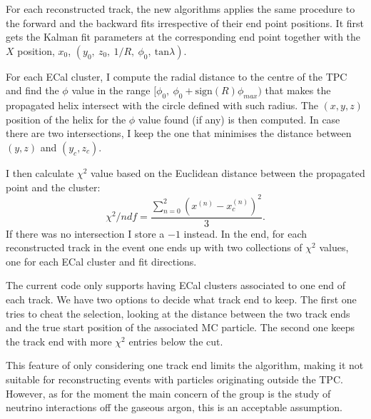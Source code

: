 For each reconstructed track, the new algorithms applies the same procedure to the forward and the backward fits irrespective of their end point positions. It first gets the Kalman fit parameters at the corresponding end point together with the $X$ position, $x_{0}$, $(y_{0}, \ z_{0}, \ 1/R, \ \phi_{0}, \ \mathrm{tan}\lambda)$.

For each ECal cluster, I compute the radial distance to the centre of the TPC and find the $\phi$ value in the range $[\phi_{0}, \ \phi_{0}+\mathrm{sign}(R)\phi_{max})$ that makes the propagated helix intersect with the circle defined with such radius. The $(x,y,z)$ position of the helix for the $\phi$ value found (if any) is then computed. In case there are two intersections, I keep the one that minimises the distance between $(y, z)$ and $(y_{c}, z_{c})$.

I then calculate $\chi^{2}$ value based on the Euclidean distance between the propagated point and the cluster:
\begin{equation}
	\chi^{2}/ndf = \frac{\sum_{n=0}^{2}\left(x^{(n)}-x^{(n)}_{c}\right)^{2}}{3}.
\end{equation}
If there was no intersection I store a $-1$ instead. In the end, for each reconstructed track in the event one ends up with two collections of $\chi^{2}$ values, one for each ECal cluster and fit directions.

The current code only supports having ECal clusters associated to one end of each track. We have two options to decide what track end to keep. The first one tries to cheat the selection, looking at the distance between the two track ends and the true start position of the associated MC particle. The second one keeps the track end with more $\chi^{2}$ entries below the cut.

This feature of only considering one track end limits the algorithm, making it not suitable for reconstructing events with particles originating outside the TPC. However, as for the moment the main concern of the group is the study of neutrino interactions off the gaseous argon, this is an acceptable assumption.

